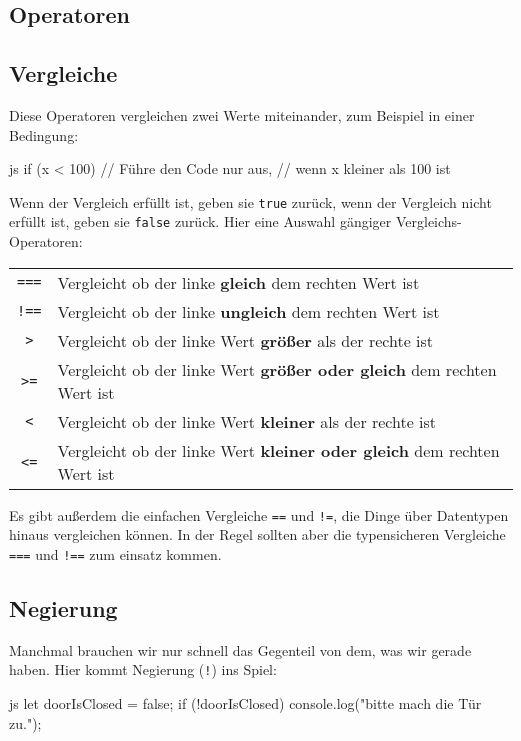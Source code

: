 \documentclass[10pt,a4paper]{article}
\begin{document}
\begin{multicols}{3}
\section*{Operatoren}
\subsection*{Vergleiche}
Diese Operatoren vergleichen zwei Werte miteinander, zum Beispiel in einer Bedingung:
\begin{codebox}{js}{}
  if (x < 100) {
    // Führe den Code nur aus,
    // wenn x kleiner als 100 ist
  }
\end{codebox}
Wenn der Vergleich erfüllt ist, geben sie \texttt{true} zurück, wenn der Vergleich nicht erfüllt ist, geben sie \texttt{false} zurück. Hier eine Auswahl gängiger Vergleichs-Operatoren:

\vspace{0.5cm}
\begin{tabular}{c l}
  \texttt{===} & Vergleicht ob der linke \textbf{gleich} dem rechten Wert ist \\
  \texttt{!==} & Vergleicht ob der linke \textbf{ungleich} dem rechten Wert ist \\
  \texttt{>} & Vergleicht ob der linke Wert \textbf{größer} als der rechte ist \\
  \texttt{>=} & Vergleicht ob der linke Wert \textbf{größer oder gleich} dem rechten Wert ist \\
  \texttt{<} & Vergleicht ob der linke Wert \textbf{kleiner} als der rechte ist \\
  \texttt{<=} & Vergleicht ob der linke Wert \textbf{kleiner oder gleich} dem rechten Wert ist \\
\end{tabular}

Es gibt außerdem die einfachen Vergleiche \texttt{==} und \texttt{!=}, die Dinge über Datentypen hinaus vergleichen können. In der Regel sollten aber die typensicheren Vergleiche \texttt{===} und \texttt{!==} zum einsatz kommen.

\subsection*{Negierung}
Manchmal brauchen wir nur schnell das Gegenteil von dem, was wir gerade haben. Hier kommt Negierung (\texttt{!}) ins Spiel:
\begin{codebox}{js}{}
  let doorIsClosed = false;
  if (!doorIsClosed) {
    console.log("bitte mach die Tür zu.");
  }
\end{codebox}


\end{multicols}
\end{document}

